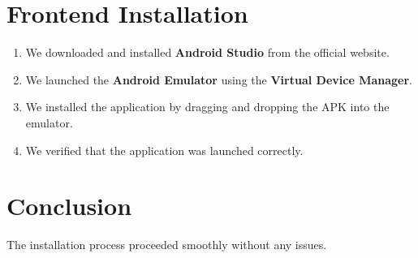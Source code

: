 \section{Frontend Installation}
\begin{enumerate}
    \item We downloaded and installed \textbf{Android Studio} from the official website.
    \item We launched the \textbf{Android Emulator} using the \textbf{Virtual Device Manager}.
    \item We installed the application by dragging and dropping the APK into the emulator.
    \item We verified that the application was launched correctly.
\end{enumerate}

\section{Conclusion}
The installation process proceeded smoothly without any issues.

